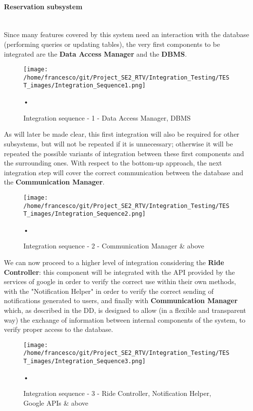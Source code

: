 \documentclass[10pt, a4paper,titlepage]{article}
\begin{document}
\paragraph{Reservation subsystem}\mbox{}\\
Since many features covered by this system need an interaction with the database (performing queries or updating tables), the very first components to be integrated are the \textbf{Data Access Manager} and the \textbf{DBMS}.
\begin{figure}[h]
\begin{center}
\texttt{[image: /home/francesco/git/Project\_SE2\_RTV/Integration\_Testing/TEST\_images/Integration\_Sequence1.png]}
\caption{Integration sequence - 1 - Data Access Manager, DBMS}
\label{fig:int_seq1}
\end{center}•
\end{figure}
As will later be made clear, this first integration will also be required for other subsystems, but will not be repeated if it is unnecessary; otherwise it will be repeated the possible variants of integration between these first components and the surrounding ones.
With respect to the bottom-up approach, the next integration step will cover the correct communication between the database and the \textbf{Communication Manager}.
\begin{figure}[h]
\begin{center}
\texttt{[image: /home/francesco/git/Project\_SE2\_RTV/Integration\_Testing/TEST\_images/Integration\_Sequence2.png]}
\caption{Integration sequence - 2 - Communication Manager \& above}
\label{fig:int_seq2}
\end{center}•
\end{figure}
We can now proceed to a higher level of integration considering the \textbf{Ride Controller}:
this component will be integrated with the API provided by the services of google in order to verify the correct use within their own methods, with the "Notification Helper" in order to verify the correct sending of notifications generated to users, and finally with \textbf{Communication Manager} which, as described in the DD, is designed to allow (in a flexible and transparent way) the exchange of information between internal components of the system, to verify proper access to the database.
\begin{figure}[h]
\begin{center}
\texttt{[image: /home/francesco/git/Project\_SE2\_RTV/Integration\_Testing/TEST\_images/Integration\_Sequence3.png]}
\caption{Integration sequence - 3 - Ride Controller, Notification Helper, Google APIs \& above}
\label{fig:int_seq3}
\end{center}•
\end{figure}
\end{document}
